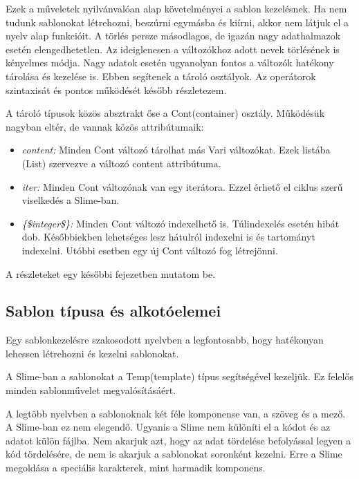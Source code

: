 Ezek a műveletek nyilvánvalóan alap követelményei a sablon kezelésnek. 
Ha nem tudunk sablonokat létrehozni, beszúrni egymásba és kiírni, akkor nem látjuk el a nyelv alap funkcióit.
A törlés persze másodlagos, de igazán nagy adathalmazok esetén elengedhetetlen. 
Az ideiglenesen a változókhoz adott nevek törlésének is kényelmes módja.
Nagy adatok esetén ugyanolyan fontos a változók hatékony tárolása és kezelése is.
Ebben segítenek a tároló osztályok.
Az operátorok szintaxisát és pontos működését később részletezem. 

A tároló típusok közös absztrakt őse a Cont(container) osztály.
Működésük nagyban eltér, de vannak közös attribútumaik:
\begin{itemize}
\item \emph{content:} 
Minden Cont változó tárolhat más Vari változókat.
Ezek listába (List) szervezve a változó content attribútuma. 
\item \emph{iter:} 
Minden Cont változónak van egy iterátora.
Ezzel érhető el ciklus szerű viselkedés a Slime-ban.
\item \emph{\{\$integer\$\}:} 
Minden Cont változó indexelhető is.
Túlindexelés esetén hibát dob.
Későbbiekben lehetséges lesz hátulról indexelni is és tartományt indexelni.
Utóbbi esetben egy új Cont változó fog létrejönni.
\end{itemize}

A részleteket egy későbbi fejezetben mutatom be. 

\subsection{Sablon típusa és alkotóelemei}
Egy sablonkezelésre szakosodott nyelvben a legfontosabb, hogy hatékonyan lehessen létrehozni és kezelni sablonokat.

A Slime-ban a sablonokat a Temp(template) típus segítségével kezeljük. Ez felelős minden sablonművelet megvalósításáért.

A legtöbb nyelvben a sablonoknak két féle komponense van, a szöveg és a mező. 
A Slime-ban ez nem elegendő.
Ugyanis a Slime nem különíti el a kódot és az adatot külön fájlba.
Nem akarjuk azt, hogy az adat tördelése befolyással legyen a kód tördelésére, de nem is akarjuk a sablonokat soronként kezelni. 
Erre a Slime megoldása a speciális karakterek, mint harmadik komponens.

